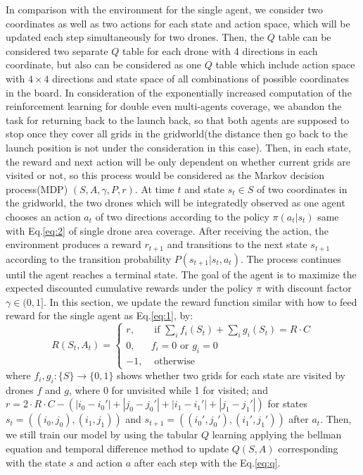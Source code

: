 \documentclass{article}
\begin{document}
In comparison with the environment for the single agent, we consider two coordinates as well as two actions for each state and action space, which will be updated each step simultaneously for two drones. Then, the $Q$ table can be considered two separate $Q$ table for each drone with 4 directions in each coordinate, but also can be considered as one $Q$ table which include action space with $4\times 4$ directions and state space of all combinations of possible coordinates in the board. In consideration of the exponentially increased computation of the reinforcement learning for double even multi-agents coverage, we abandon the task for returning back to the launch back, so that both agents are supposed to stop once they cover all grids in the gridworld(the distance then go back to the launch position is not under the consideration in this case). Then, in each state, the reward and next action will be only dependent on whether current grids are visited or not, so this process would be considered as the Markov decision process(MDP) $(S, A, \gamma, P, r)$. At time $t$ and state $s_t\in S$ of two coordinates in the gridworld, the two drones which will be integratedly observed as one agent chooses an action $a_t$ of two directions according to the policy $\pi(a_t|s_t)$ same with Eq.\ref{eq:2} of single drone area coverage. After receiving the action, the environment produces a reward $r_{t+1}$ and
transitions to the next state $s_{t+1}$ according to the transition probability $P(s_{t+1}|s_t,a_t)$. The process continues until the agent reaches a terminal state. The goal of the agent is to maximize the expected discounted cumulative rewards under the policy $\pi$ with discount factor $\gamma\in (0, 1]$. In this section, we update the reward function similar with how to feed reward for the single agent as Eq.\ref{eq:1}, by:
\begin{equation}
\label{eq:mrl_r}
R\left(S_t, A_t\right)=\left\{\begin{array}{ll}
r, & \text { if } \sum_{i} f_{i}\left(S_{t}\right)+\sum_{i}g_{i}\left(S_{t}\right) = R\cdot C \\
0, & f_{i} = 0 \text{ or } g_{i} = 0\\
-1, & \text { otherwise }
\end{array}\right.
\end{equation}
where $f_i, g_i:\{S\} \rightarrow \{0,1\}$ shows whether two grids for each state are visited by drones $f$ and $g$, where 0 for unvisited while 1 for visited; and $r = 2\cdot R\cdot C - \left(|i_0-i_0'|+|j_0-j_0'|+|i_1-i_1'|+|j_1-j_1'|\right)$ for states $s_t=((i_0,j_0),(i_1,j_1))$ and $s_{t+1}=((i_0',j_0'),(i_1',j_1'))$ after $a_t$. Then, we still train our model by using the tabular $Q$ learning applying the bellman equation and temporal difference method to update $Q(S,A)$ corresponding with the state $s$ and action $a$ after each step with the Eq.\ref{eq:q}.
\end{document}
